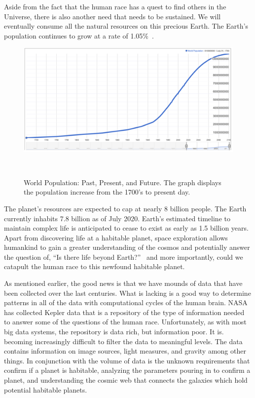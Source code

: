 \documentclass[letterpaper, 10 pt, conference]{ieeeconf}  %
\begin{document}
Aside from the fact that the human race has a quest to find others in the Universe, there is also another need that needs to be sustained. We will eventually consume all the natural resources on this precious Earth. The Earth's population continues to grow at a rate of 1.05\%~\cite{BASAK2020100335}. 

\begin{figure}
	\centering
	\includegraphics[width=0.7\linewidth]{Images/WorldPopulation}
	\caption[World Population from 1700's to Present Day]{World Population: Past, Present, and Future. The graph displays the population increase from the 1700's to present day.}~\cite{PopulationClock202007}
	\label{fig:worldpopulation}
\end{figure}

The planet’s resources are expected to cap at nearly 8 billion people. The Earth currently inhabits 7.8 billion as of July 2020. Earth’s estimated timeline to maintain complex life is anticipated to cease to exist as early as 1.5 billion years. Apart from discovering life at a habitable planet, space exploration allows humankind to gain a greater understanding of the cosmos and potentially answer the question of, “Is there life beyond Earth?”~\cite{ScienceMissionDirectorate2020} and more importantly, could we catapult the human race to this newfound habitable planet.

As mentioned earlier, the good news is that we have mounds of data that have been collected over the last centuries. What is lacking is a good way to determine patterns in all of the data with computational cycles of the human brain. NASA has collected Kepler data that is a repository of the type of information needed to answer some of the questions of  the human race. Unfortunately, as with most big data systems, the repository is data rich, but information poor. It is. becoming increasingly difficult to filter the data to meaningful levels. The data contains information on image sources, light measures, and gravity among other things. In conjunction with the volume of data is the unknown requirements that confirm if a planet is habitable, analyzing the parameters pouring in to confirm a planet, and understanding the cosmic web that connects the galaxies which hold potential habitable planets. 
\end{document}
